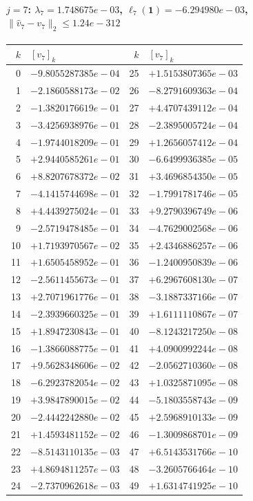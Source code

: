 \paragraph{$j = 7$: $\lambda_{7} = 1.748675e-03$, \quad $\ell_{7}(\mathbf{1}) = -6.294980e-03$, \quad $\|\hat{v}_{7} - v_{7}\|_2 \leq 1.24e-312$}
\begin{center}
{\footnotesize
\begin{tabular}{r@{\;\;}l@{\quad}r@{\;\;}l}
\toprule
$k$ & $[v_{7}]_k$ & $k$ & $[v_{7}]_k$ \\
\midrule
0 & $-9.8055287385e-04$ & 25 & $+1.5153807365e-03$ \\
1 & $-2.1860588173e-02$ & 26 & $-8.2791609363e-04$ \\
2 & $-1.3820176619e-01$ & 27 & $+4.4707439112e-04$ \\
3 & $-3.4256938976e-01$ & 28 & $-2.3895005724e-04$ \\
4 & $-1.9744018209e-01$ & 29 & $+1.2656057412e-04$ \\
5 & $+2.9440585261e-01$ & 30 & $-6.6499936385e-05$ \\
6 & $+8.8207678372e-02$ & 31 & $+3.4696854350e-05$ \\
7 & $-4.1415744698e-01$ & 32 & $-1.7991781746e-05$ \\
8 & $+4.4439275024e-01$ & 33 & $+9.2790396749e-06$ \\
9 & $-2.5719478485e-01$ & 34 & $-4.7629002568e-06$ \\
10 & $+1.7193970567e-02$ & 35 & $+2.4346886257e-06$ \\
11 & $+1.6505458952e-01$ & 36 & $-1.2400950839e-06$ \\
12 & $-2.5611455673e-01$ & 37 & $+6.2967608130e-07$ \\
13 & $+2.7071961776e-01$ & 38 & $-3.1887337166e-07$ \\
14 & $-2.3939660325e-01$ & 39 & $+1.6111110867e-07$ \\
15 & $+1.8947230843e-01$ & 40 & $-8.1243217250e-08$ \\
16 & $-1.3866088775e-01$ & 41 & $+4.0900992244e-08$ \\
17 & $+9.5628348606e-02$ & 42 & $-2.0562710360e-08$ \\
18 & $-6.2923782054e-02$ & 43 & $+1.0325871095e-08$ \\
19 & $+3.9847890015e-02$ & 44 & $-5.1803558743e-09$ \\
20 & $-2.4442242880e-02$ & 45 & $+2.5968910133e-09$ \\
21 & $+1.4593481152e-02$ & 46 & $-1.3009868701e-09$ \\
22 & $-8.5143110135e-03$ & 47 & $+6.5143531766e-10$ \\
23 & $+4.8694811257e-03$ & 48 & $-3.2605766464e-10$ \\
24 & $-2.7370962618e-03$ & 49 & $+1.6314741925e-10$ \\
\bottomrule
\end{tabular}
}
\end{center}

